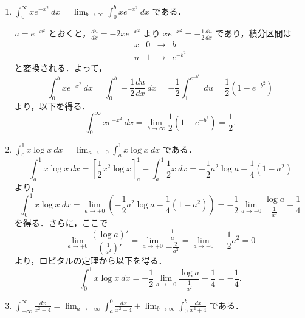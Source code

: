 \documentclass[11pt, uplatex, dvipdfmx]{jsarticle}
\newcommand{\ds}{\displaystyle}
\begin{document}
\begin{enumerate}[(1)]
   \item $\ds \int_{0}^{\infty} x e^{-x^2} \ dx = \lim_{b \to \infty} \int_{0}^{b} x e^{-x^2} \ dx$ である．

     \vspace{1zh}

     $u= e^{-x^2}$ とおくと，$\frac{du}{dx} = -2x e^{-x^2}$
     より $x e^{-x^2} = -\frac{1}{2} \frac{du}{dx}$ であり，積分区間は
     \[
       \begin{array}{c|ccc}
         x & 0 & \to & b\\ \hline
         u & 1 & \to & e^{-b^2}
       \end{array}
     \]
     と変換される．よって，
     \[
       \int_{0}^{b} x e^{-x^2} \ dx = \int_{0}^{b} -\frac{1}{2} \frac{du}{dx} \ dx = - \frac{1}{2}\int_{1}^{e^{-b^2}} \ du
       = \frac{1}{2} \left(1 - e^{-b^2}\right)
     \]
     より，以下を得る．
     \[
       \int_{0}^{\infty} x e^{-x^2} \ dx = \lim_{b \to \infty} \frac{1}{2} \left( 1 - e^{-b^2} \right) = \frac{1}{2}.
     \]

   \item $\ds \int_{0}^{1} x \log x \ dx = \lim_{a \to +0} \int_{a}^{1} x  \log x \ dx$ である．
     \[
       \int_{a}^{1} x \log x \ dx = \left[ \frac{1}{2}x^2 \log x \right]_{a}^{1} - \int_{a}^{1} \frac{1}{2} x \ dx
       = - \frac{1}{2}a^2 \log a - \frac{1}{4} \left(1-a^2\right)
     \]
     より，
     \[
       \int_{0}^{1} x \log x \ dx = \lim_{a \to +0} \left(-\frac{1}{2}a^2 \log a - \frac{1}{4}\left( 1-a^2 \right) \right)
                                    = -\frac{1}{2} \lim_{a \to +0}  \frac{\log a}{\frac{1}{a^2}} - \frac{1}{4}
     \]
     を得る．さらに，ここで
     \[
       \lim_{a \to +0} \frac{ \left( \log a\right)'}{\left( \frac{1}{a^2} \right)'} 
       = \lim_{a \to +0} \frac{\frac{1}{a}}{-\frac{2}{a^3}} = \lim_{a \to +0} -\frac{1}{2} a^2 =0
     \]
     より，ロピタルの定理から以下を得る．
     \[
       \int_{0}^{1} x \log x \ dx = -\frac{1}{2} \lim_{a \to +0} \frac{\log a}{\frac{1}{a^2}} - \frac{1}{4} = -\frac{1}{4}.
     \]

   \item $\ds \int_{-\infty}^{\infty} \frac{dx}{x^2+4} = \lim_{a \to -\infty} \int_{a}^{0} \frac{dx}{x^2+4}
     + \lim_{b \to \infty} \int_{0}^{b}\frac{dx}{x^2+4}$ である．

     \vspace{1zh}
     

\end{enumerate}
\end{document}
